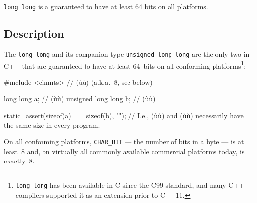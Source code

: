 

\setcounter{table}{0}
\setcounter{footnote}{0}
\setcounter{lstlisting}{0}


\lstinline!long!~\lstinline!long! is a  guaranteed to have at least 64 bits on all
platforms.

\subsection[Description]{Description}\label{description}

The  \lstinline!long!~\lstinline!long! and its companion
type \lstinline!unsigned!~\lstinline!long!~\lstinline!long! are the only two
 in C++ that are guaranteed to have
at least 64~bits on all conforming platforms{\cprotect\footnote{\lstinline!long!~\lstinline!long!
has been available in C since the C99 standard, and many C++ compilers
  supported it as an extension prior to C++11.}}:

\begin{emcppslisting}[language=C++]
#include <climits>  // (ù{}ù) (a.k.a.~8, see below)

long long          a;  // (ù{}ù)
unsigned long long b;  // (ù{}ù)

static_assert(sizeof(a) == sizeof(b), "");
    // I.e., (ù{}ù) and (ù{}ù) necessarily have the same size in every program.
\end{emcppslisting}
    
\noindent On all conforming platforms, \lstinline!CHAR_BIT! --- the number of bits
in a byte --- is at least~8 and, on virtually all commonly available
commercial platforms today, is exactly~8.

